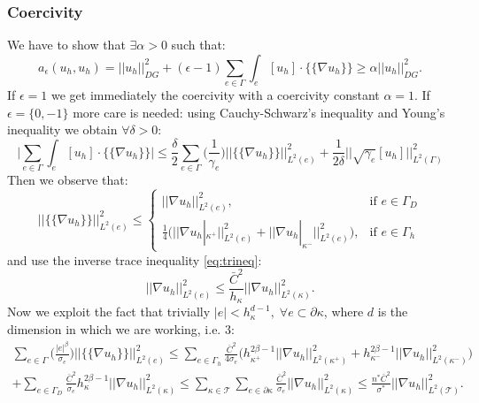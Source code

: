 \documentclass[12pt, a4paper]{article}
\theoremstyle{definition}
\theoremstyle{plain}
\theoremstyle{plain}
\begin{document}
\subsubsection{Coercivity}
We have to show that $\exists \alpha > 0 $ such that:
\begin{equation*}
a_\epsilon(u_h, u_h) = |\!|u_h|\!|^2_{DG} + (\epsilon - 1) \sum_{e \in \Gamma} \int_e [u_h] \cdot \{\!\!\{ \nabla u_h \}\!\!\} \geq \alpha |\!|u_h|\!|^2_{DG}.
\end{equation*}
If $\epsilon = 1$ we get immediately the coercivity with a coercivity constant $\alpha = 1$.
If $\epsilon = \{0,-1\}$ more care is needed: using Cauchy-Schwarz's inequality and Young's inequality we obtain $\forall \delta > 0$:
\begin{equation} \label{pas:young}
\bigg| \sum_{e \in \Gamma} \int_e [u_h] \cdot \{\!\!\{ \nabla u_h \}\!\!\} \bigg| \leq
\frac{\delta}{2} \sum_{e \in \Gamma} \bigg( \frac{1}{\gamma_e} \bigg)  \big|\!\big| \{\!\!\{ \nabla u_h \}\!\!\} \big|\!\big|^2_{L^2(e)}
+ \frac{1}{2\delta} \bigg|\!\bigg| \sqrt{\gamma_e} [u_h] \bigg|\!\bigg|^2_{L^2(\Gamma)}
\end{equation}
Then we observe that:
\begin{equation*}
\big|\!\big| \{\!\!\{ \nabla u_h \}\!\!\} \big|\!\big|^2_{L^2(e)} \leq
\begin{cases}
\big|\!\big| \nabla u_h \big|\!\big|^2_{L^2(e)}, & \text{if } e \in \Gamma_D\\
\frac{1}{4} \big( \big|\!\big| \nabla u_h|_{\kappa^+} \big|\!\big|^2_{L^2(e)} + \big|\!\big| \nabla u_h|_{\kappa^-} \big|\!\big|^2_{L^2(e)} \big), & \text{if } e \in \Gamma_h
\end{cases}
\end{equation*}
and use the inverse trace inequality \eqref{eq:trineq}:
\begin{equation*}
\big|\!\big| \nabla u_h \big|\!\big|^2_{L^2(e)} \leq \frac{\bar{C}^2}{h_\kappa} \big|\!\big| \nabla u_h \big|\!\big|^2_{L^2(\kappa)}.
\end{equation*}
Now we exploit the fact that trivially $|e| < h_\kappa^{d-1}, \; \forall e \subset \partial \kappa$, where $d$ is the dimension in which we are working, i.e. $3$:
\begin{multline} \label{pas:invineq}
\sum_{e \in \Gamma} \bigg( \frac{|e|^\beta}{\sigma_e} \bigg)  \big|\!\big| \{\!\!\{ \nabla u_h \}\!\!\} \big|\!\big|^2_{L^2(e)}
\leq \sum_{e \in \Gamma_h} \frac{\bar{C}^2}{4\sigma_e} \bigg( h_{\kappa^+}^{2\beta - 1} \big|\!\big| \nabla u_h \big|\!\big|^2_{L^2(\kappa^+)} + h_{\kappa^-}^{2\beta - 1} \big|\!\big| \nabla u_h \big|\!\big|^2_{L^2(\kappa^-)} \bigg)\\
+ \sum_{e \in \Gamma_D} \frac{\bar{C}^2}{\sigma_e} h_\kappa^{2\beta - 1} \big|\!\big| \nabla u_h \big|\!\big|^2_{L^2(\kappa)}
\leq \sum_{\kappa \in \mathcal{T}} \sum_{e \in \partial \kappa} \frac{\bar{C}^2}{\sigma_e} \big|\!\big| \nabla u_h \big|\!\big|^2_{L^2(\kappa)}
\leq \frac{n^*\bar{C}^2}{\sigma^*} \big|\!\big| \nabla u_h \big|\!\big|^2_{L^2(\mathcal{T})}.
\end{multline}
\end{document}
